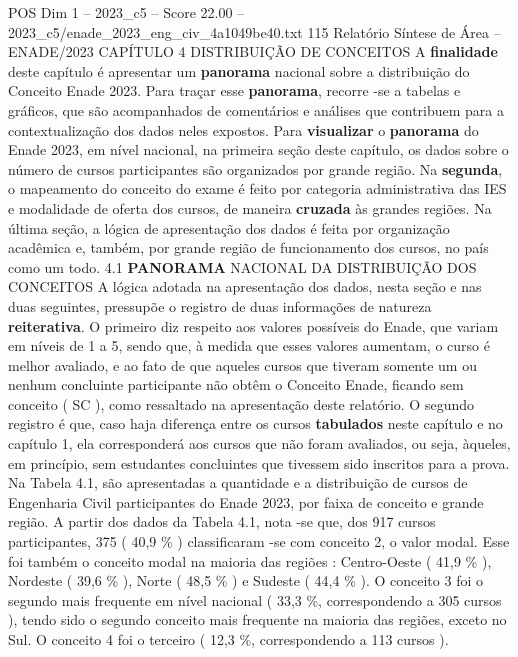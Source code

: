 \begin{textsample}{POS Dim 1 – 2023\_c5 – Score 22.00 – 2023\_c5/enade\_2023\_eng\_civ\_4a1049be40.txt}  \label{ex:f1_pos_003}
115 Relatório Síntese de Área – ENADE/2023 CAPÍTULO 4 DISTRIBUIÇÃO DE CONCEITOS A \textbf{finalidade} deste capítulo é apresentar um \textbf{panorama} nacional sobre a distribuição do Conceito Enade 2023.
Para traçar esse \textbf{panorama}, recorre -se a tabelas e gráficos, que são acompanhados de comentários e análises que contribuem para a contextualização dos dados neles expostos.
Para \textbf{visualizar} o \textbf{panorama} do Enade 2023, em nível nacional, na primeira seção deste capítulo, os dados sobre o número de cursos participantes são organizados por grande região.
Na \textbf{segunda}, o mapeamento do conceito do exame é feito por categoria administrativa das IES e modalidade de oferta dos cursos, de maneira \textbf{cruzada} às grandes regiões.
Na última seção, a lógica de apresentação dos dados é feita por organização acadêmica e, também, por grande região de funcionamento dos cursos, no país como um todo. 4.1 \textbf{PANORAMA} NACIONAL DA DISTRIBUIÇÃO DOS CONCEITOS A lógica adotada na apresentação dos dados, nesta seção e nas duas seguintes, pressupõe o registro de duas informações de natureza \textbf{reiterativa}.
O primeiro diz respeito aos valores possíveis do Enade, que variam em níveis de 1 a 5, sendo que, à medida que esses valores aumentam, o curso é melhor avaliado, e ao fato de que aqueles cursos que tiveram somente um ou nenhum concluinte participante não obtêm o Conceito Enade, ficando sem conceito ( SC ), como ressaltado na apresentação deste relatório.
O segundo registro é que, caso haja diferença entre os cursos \textbf{tabulados} neste capítulo e no capítulo 1, ela corresponderá aos cursos que não foram avaliados, ou seja, àqueles, em princípio, sem estudantes concluintes que tivessem sido inscritos para a prova.
Na Tabela 4.1, são apresentadas a quantidade e a distribuição de cursos de Engenharia Civil participantes do Enade 2023, por faixa de conceito e grande região.
A partir dos dados da Tabela 4.1, nota -se que, dos 917 cursos participantes, 375 ( 40,9 \% ) classificaram -se com conceito 2, o valor modal.
Esse foi também o conceito modal na maioria das regiões : Centro-Oeste ( 41,9 \% ), Nordeste ( 39,6 \% ), Norte ( 48,5 \% ) e Sudeste ( 44,4 \% ).
O conceito 3 foi o segundo mais frequente em nível nacional ( 33,3 \%, correspondendo a 305 cursos ), tendo sido o segundo conceito mais frequente na maioria das regiões, exceto no Sul.
O conceito 4 foi o terceiro ( 12,3 \%, correspondendo a 113 cursos ).

\end{textsample}

